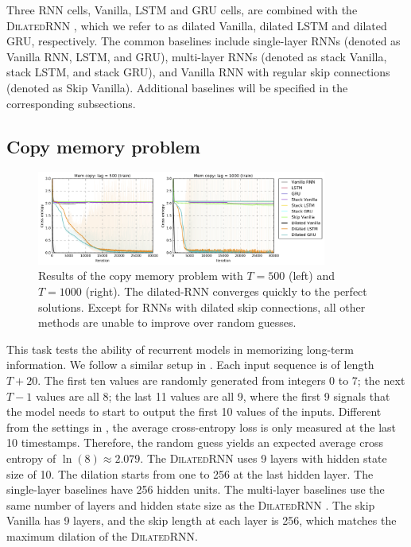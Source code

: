 \documentclass{article}
\newcommand{\algname}{\textsc{DilatedRNN }}
\newcommand{\algnamens}{\textsc{DilatedRNN}}
\begin{document}
Three RNN cells, Vanilla, LSTM and GRU cells, are combined with the \algname, which we refer to as dilated Vanilla, dilated LSTM and dilated GRU, respectively.  The common baselines include single-layer RNNs (denoted as Vanilla RNN, LSTM, and GRU), multi-layer RNNs (denoted as stack Vanilla, stack LSTM, and stack GRU), and Vanilla RNN with regular skip connections (denoted as Skip Vanilla). Additional baselines will be specified in the corresponding subsections.

\subsection{Copy memory problem}
\begin{figure}[t]
  \centering
  \includegraphics[width=0.85\textwidth]{./figure/memcopy_combine.png}
  \vspace*{-0.1in}
  \caption{Results of the copy memory problem with $T=500$ (left) and $T=1000$ (right). The dilated-RNN converges quickly to the perfect solutions.  Except for RNNs with dilated skip connections, all other methods are unable to improve over random guesses.}
  \label{fig:memcopy}
  \vspace*{-0.15in}
\end{figure}

This task tests the ability of recurrent models in memorizing long-term information.  We follow a similar setup in \cite{arjovsky2016unitary, wisdom2016full, hochreiter1997long}.  Each input sequence is of length $T + 20$. The first ten values are randomly generated from integers 0 to 7;  the next $T - 1$ values are all 8; the last 11 values are all 9, where the first 9 signals that the model needs to start to output the first 10 values of the inputs.   Different from the settings in \cite{arjovsky2016unitary, wisdom2016full}, the average cross-entropy loss is only measured at the last 10 timestamps.  Therefore, the random guess yields an expected average cross entropy of $\ln(8) \approx 2.079$.  The \algname uses 9 layers with hidden state size of 10.  The dilation starts from one to 256 at the last hidden layer.  The single-layer baselines have 256 hidden units. The multi-layer baselines use the same number of layers and hidden state size as the \algname.  The skip Vanilla has 9 layers, and the skip length at each layer is 256,  which matches the maximum dilation of the \algnamens.  
\end{document}
